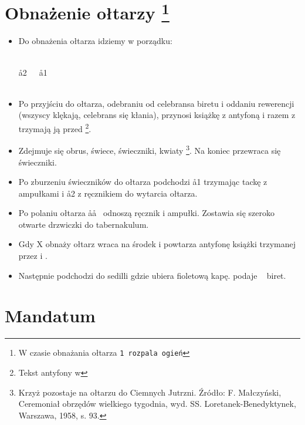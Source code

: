 \section[Obnażenie ołtarzy]{Obnażenie ołtarzy \protect\footnote{W czasie
        obnażania ołtarza \tt1 rozpala ogień}}

\begin{itemize}
      \item Do obnażenia ołtarza idziemy w porządku:
            \begin{center}
                  \uparrow \smallskip\\
                  \aa2~~~\aa1 \smallskip\\
                  ~~~ \smallskip\\
                  \ii
            \end{center}
      \item Po przyjściu do ołtarza, odebraniu od celebransa biretu i oddaniu
            rewerencji (wszyscy klękają, celebrans się kłania),  przynosi
            książkę z antyfoną i razem z  trzymają ją przed \ii
            \footnote{Tekst antyfony w }.
      \item Zdejmuje się obrus, świece, świeczniki, kwiaty \footnote{Krzyż
                  pozostaje na ołtarzu do Ciemnych Jutrzni. Źródło: F. Małczyński,
                  Ceremoniał obrzędów wielkiego tygodnia, wyd. SS.
                  Loretanek-Benedyktynek, Warszawa, 1958, s. 93.}. Na koniec przewraca
            się świeczniki.
      \item Po zburzeniu świeczników do ołtarza podchodzi \aa1 trzymając tackę z
            ampułkami i \aa2 z ręcznikiem do wytarcia ołtarza.
      \item Po polaniu ołtarza \aa\aa~ odnoszą ręcznik i ampułki. Zostawia się
            szeroko otwarte drzwiczki do tabernakulum.
      \item Gdy X obnaży ołtarz wraca na środek i powtarza antyfonę książki
            trzymanej przez  i .
      \item Następnie podchodzi do sedilli gdzie ubiera fioletową kapę. 
            podaje \ii~ biret.
\end{itemize}

\section{Mandatum}

